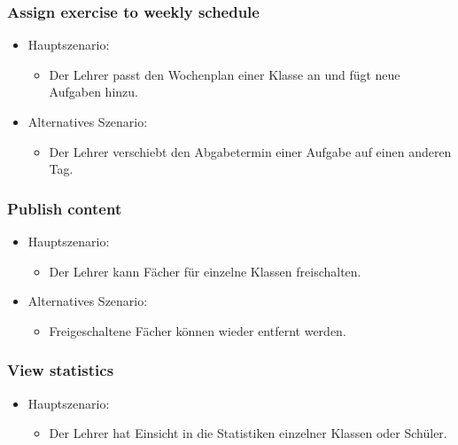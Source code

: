 \subsubsection*{Assign exercise to weekly schedule}
\begin{itemize}
	\item Hauptszenario:
	\begin{itemize}
		\item Der Lehrer passt den Wochenplan einer Klasse an und fügt neue Aufgaben hinzu.
	\end{itemize}
	\item Alternatives Szenario:
	\begin{itemize}
		\item Der Lehrer verschiebt den Abgabetermin einer Aufgabe auf einen anderen Tag.
	\end{itemize}
\end{itemize}



\subsubsection*{Publish content}
\begin{itemize}
	\item Hauptszenario:
	\begin{itemize}
		\item Der Lehrer kann Fächer für einzelne Klassen freischalten.
	\end{itemize}
	\item Alternatives Szenario:
	\begin{itemize}
		\item Freigeschaltene Fächer können wieder entfernt werden.
	\end{itemize}
\end{itemize}



\subsubsection*{View statistics}
\begin{itemize}
	\item Hauptszenario:
	\begin{itemize}
		\item Der Lehrer hat Einsicht in die Statistiken einzelner Klassen oder Schüler.
	\end{itemize}
\end{itemize}


